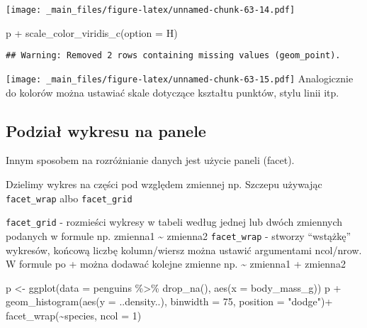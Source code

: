 \documentclass[
]{book}
\newenvironment{Shaded}{\begin{snugshade}}{\end{snugshade}}
\newcommand{\AttributeTok}[1]{\textcolor[rgb]{0.77,0.63,0.00}{#1}}
\newcommand{\DecValTok}[1]{\textcolor[rgb]{0.00,0.00,0.81}{#1}}
\newcommand{\FunctionTok}[1]{\textcolor[rgb]{0.00,0.00,0.00}{#1}}
\newcommand{\NormalTok}[1]{#1}
\newcommand{\OtherTok}[1]{\textcolor[rgb]{0.56,0.35,0.01}{#1}}
\newcommand{\SpecialCharTok}[1]{\textcolor[rgb]{0.00,0.00,0.00}{#1}}
\newcommand{\StringTok}[1]{\textcolor[rgb]{0.31,0.60,0.02}{#1}}
\begin{document}
\texttt{[image: \_main\_files/figure-latex/unnamed-chunk-63-14.pdf]}

\begin{Shaded}
\begin{Highlighting}[]
\NormalTok{p }\SpecialCharTok{+} \FunctionTok{scale\_color\_viridis\_c}\NormalTok{(}\AttributeTok{option =} \StringTok{\textquotesingle{}H\textquotesingle{}}\NormalTok{)}
\end{Highlighting}
\end{Shaded}

\begin{verbatim}
## Warning: Removed 2 rows containing missing values (geom_point).
\end{verbatim}

\texttt{[image: \_main\_files/figure-latex/unnamed-chunk-63-15.pdf]}
Analogicznie do kolorów można ustawiać skale dotyczące kształtu punktów, stylu linii itp.

\hypertarget{podziaux142-wykresu-na-panele}{%
\subsection{Podział wykresu na panele}\label{podziaux142-wykresu-na-panele}}

Innym sposobem na rozróżnianie danych jest użycie paneli (facet).

Dzielimy wykres na części pod względem zmiennej np. Szczepu używając \texttt{facet\_wrap} albo \texttt{facet\_grid}

\texttt{facet\_grid} - rozmieści wykresy w tabeli według jednej lub dwóch zmiennych podanych w formule np. zmienna1 \textasciitilde{} zmienna2
\texttt{facet\_wrap} - stworzy ``wstążkę'' wykresów, końcową liczbę kolumn/wiersz można ustawić argumentami ncol/nrow. W formule po + można dodawać kolejne zmienne np. \textasciitilde{} zmienna1 + zmienna2

\begin{Shaded}
\begin{Highlighting}[]
\NormalTok{p }\OtherTok{\textless{}{-}} \FunctionTok{ggplot}\NormalTok{(}\AttributeTok{data =}\NormalTok{ penguins }\SpecialCharTok{\%\textgreater{}\%} \FunctionTok{drop\_na}\NormalTok{(), }\FunctionTok{aes}\NormalTok{(}\AttributeTok{x =}\NormalTok{ body\_mass\_g))}
\NormalTok{p }\SpecialCharTok{+} \FunctionTok{geom\_histogram}\NormalTok{(}\FunctionTok{aes}\NormalTok{(}\AttributeTok{y =}\NormalTok{ ..density..), }\AttributeTok{binwidth =} \DecValTok{75}\NormalTok{, }\AttributeTok{position =} \StringTok{"dodge"}\NormalTok{)}\SpecialCharTok{+}
  \FunctionTok{facet\_wrap}\NormalTok{(}\SpecialCharTok{\textasciitilde{}}\NormalTok{species, }\AttributeTok{ncol =} \DecValTok{1}\NormalTok{)}
\end{Highlighting}
\end{Shaded}
\end{document}
